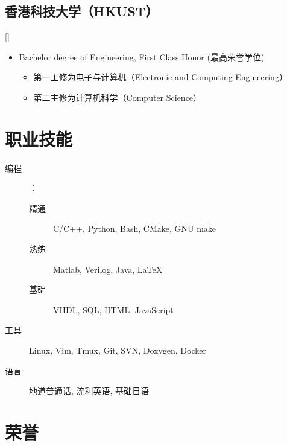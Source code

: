 \documentclass{mycv}
\begin{document}
\subsection{香港科技大学（HKUST）}[]
\vspace{-\parskip}%
\begin{itemize}[label={}]
	\item Bachelor degree of Engineering, First Class Honor (最高荣誉学位)
	\begin{itemize}[label=\textbullet]
      \item 第一主修为电子与计算机（Electronic and Computing Engineering）
      \item 第二主修为计算机科学（Computer Science）
	\end{itemize}
\end{itemize}

\section{职业技能}

\begin{description}
	
  \item[编程]：
  \begin{description}
  	\item[精通] C/C++, Python, Bash, CMake, GNU make
    \item[熟练] Matlab, Verilog, Java, \LaTeX
    \item[基础] VHDL, SQL, HTML, JavaScript
  \end{description}
  \item[工具] Linux, Vim, Tmux, Git, SVN, Doxygen, Docker %
  \item[语言] 地道普通话, 流利英语, 基础日语
\end{description}

\section{荣誉}

\end{document}
